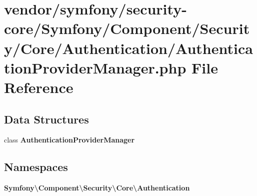 \section{vendor/symfony/security-\/core/\+Symfony/\+Component/\+Security/\+Core/\+Authentication/\+Authentication\+Provider\+Manager.php File Reference}
\label{_authentication_provider_manager_8php}
\subsection*{Data Structures}
\begin{DoxyCompactItemize}
\item 
class {\bf Authentication\+Provider\+Manager}
\end{DoxyCompactItemize}
\subsection*{Namespaces}
\begin{DoxyCompactItemize}
\item 
 {\bf Symfony\textbackslash{}\+Component\textbackslash{}\+Security\textbackslash{}\+Core\textbackslash{}\+Authentication}
\end{DoxyCompactItemize}
